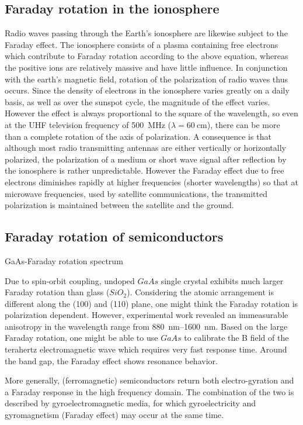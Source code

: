 \subsection{Faraday rotation in the ionosphere}

Radio waves passing through the Earth's ionosphere are likewise subject to the Faraday effect. The ionosphere consists of a plasma containing free electrons which contribute to Faraday rotation according to the above equation, whereas the positive ions are relatively massive and have little influence. In conjunction with the earth's magnetic field, rotation of the polarization of radio waves thus occurs. Since the density of electrons in the ionosphere varies greatly on a daily basis, as well as over the sunspot cycle, the magnitude of the effect varies. However the effect is always proportional to the square of the wavelength, so even at the UHF television frequency of \SI{500}{\mega\hertz} ($\lambda=\SI{60}{\cm}$), there can be more than a complete rotation of the axis of polarization. A consequence is that although most radio transmitting antennas are either vertically or horizontally polarized, the polarization of a medium or short wave signal after reflection by the ionosphere is rather unpredictable. However the Faraday effect due to free electrons diminishes rapidly at higher frequencies (shorter wavelengths) so that at microwave frequencies, used by satellite communications, the transmitted polarization is maintained between the satellite and the ground.

\subsection{Faraday rotation of semiconductors}

GaAs-Faraday rotation spectrum

Due to spin-orbit coupling, undoped $GaAs$ single crystal exhibits much larger Faraday rotation than glass ($SiO_2$). Considering the atomic arrangement is different along the (100) and (110) plane, one might think the Faraday rotation is polarization dependent. However, experimental work revealed an immeasurable anisotropy in the wavelength range from \SIrange{880}{1600}{\nano\meter}. Based on the large Faraday rotation, one might be able to use $GaAs$ to calibrate the B field of the terahertz electromagnetic wave which requires very fast response time. Around the band gap, the Faraday effect shows resonance behavior.

More generally, (ferromagnetic) semiconductors return both electro-gyration and a Faraday response in the high frequency domain. The combination of the two is described by gyroelectromagnetic media, for which gyroelectricity and gyromagnetism (Faraday effect) may occur at the same time.

